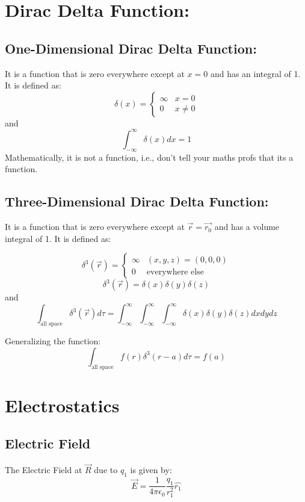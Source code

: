 \documentclass{article}
\begin{document}
\section{Dirac Delta Function: }
\subsection{One-Dimensional Dirac Delta Function: }
It is a function that is zero everywhere except at $x = 0$ and has an integral of 1. It is defined as:
\[\delta(x) = \begin{cases}
    \infty & x = 0 \\
    0 & x \neq 0
\end{cases}\]
and
\[\int_{-\infty}^{\infty} \delta(x) dx = 1\]
Mathematically, it is not a function, i.e., don't tell your maths profs that its a function.

\subsection{Three-Dimensional Dirac Delta Function: }
It is a function that is zero everywhere except at $\vec{r} = \vec{r_0}$ and has a volume integral of 1. It is defined as:

\[\delta^3(\vec{r}) = \begin{cases}
    \infty & (x,y,z) = (0,0,0) \\
    0 & \text{everywhere else}
\end{cases}\]
\[\delta^3(\vec{r}) = \delta(x)\delta(y)\delta(z)\]
and
\[\int_{\text{all space}} \delta^3\left(\vec{r}\right) d\tau = \int_{-\infty}^{\infty}\int_{-\infty}^{\infty}\int_{-\infty}^{\infty}\delta(x)\delta(y)\delta(z) dx dy dz\]

Generalizing the function:
\[\int_{\text{all space}} f(r)\delta^3\left(r-a\right) d\tau = f(a)\]

\section{Electrostatics}
\subsection{Electric Field}
\begin{center}
\end{center}
The Electric Field at $\vec{R}$ due to $q_1$ is given by:
\[\vec{E} = \frac{1}{4\pi\epsilon_0} \frac{q_1}{r_1^2} \hat{r_1}\]
\end{document}
